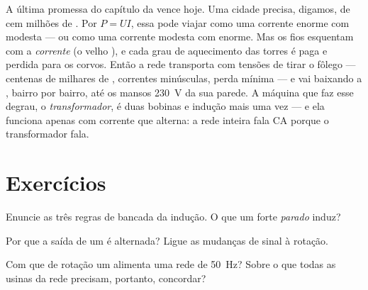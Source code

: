 \begin{remark}\label{rem:g9:alternator:transport}
A última promessa do capítulo da  vence hoje. Uma
cidade precisa, digamos, de cem milhões de . Por $P = U I$, essa
 pode viajar como uma corrente enorme com  modesta ---
ou como uma corrente modesta com  enorme. Mas os fios esquentam
com a \emph{corrente} (o velho ), e cada grau de
aquecimento das torres é  paga e perdida para os corvos. Então
a rede transporta com tensões de tirar o fôlego --- centenas de
milhares de , correntes minúsculas, perda mínima --- e vai
baixando a , bairro por bairro, até os mansos \qty{230}{V} da
sua parede. A máquina que faz esse degrau, o
\emph{transformador}, é duas bobinas e indução mais uma vez --- e ela
funciona apenas com corrente que alterna: a rede inteira fala CA
porque o transformador fala.
\end{remark}

\section{Exercícios}

\begin{exercise}[$\star$]\label{exo:g9:alternator:1}
Enuncie as três regras de bancada da indução. O que um  forte
\emph{parado} induz?
\end{exercise}

\begin{exercise}[$\star$]\label{exo:g9:alternator:2}
Por que a saída de um  é alternada? Ligue as mudanças de
sinal à rotação.
\end{exercise}

\begin{exercise}[$\star$]\label{exo:g9:alternator:3}
Com que  de rotação um  alimenta uma rede de
\qty{50}{Hz}? Sobre o que todas as usinas da rede precisam, portanto,
concordar?
\end{exercise}

